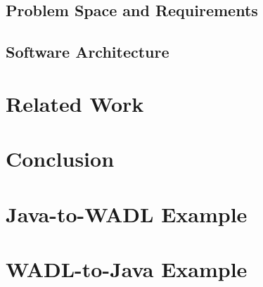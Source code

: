 \documentclass[a4paper,12pt]{article}
\begin{document}
\subsection{Problem Space and Requirements}


\subsection{Software Architecture}


\section{Related Work}


\section{Conclusion}


\newpage

\appendix

\section{Java-to-WADL Example}


\newpage

\section{WADL-to-Java Example}


\newpage


\end{document}
